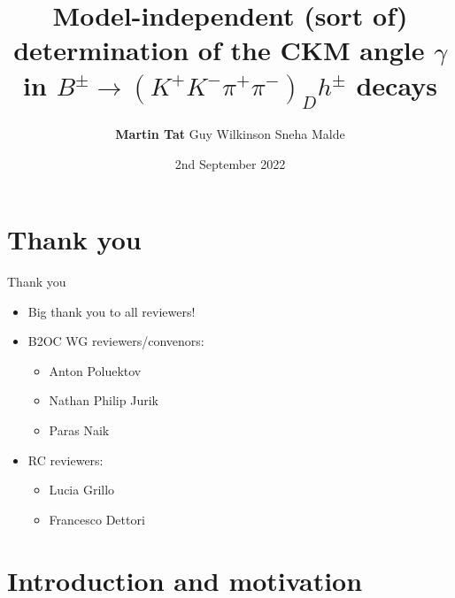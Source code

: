 \documentclass{beamer}
\title[$B^\pm\to(K^+K^-\pi^+\pi^-)_Dh^\pm$]{Model-independent (sort of) determination of the CKM angle \texorpdfstring{$\gamma$}{gamma} in \texorpdfstring{$B^\pm\to(K^+K^-\pi^+\pi^-)_Dh^\pm$}{B to K+K-pi+pi-} decays}
\author{\textbf{Martin Tat} \hspace{0.54em} Guy Wilkinson \hspace{0.54em} Sneha Malde}
\institute{\normalsize University of Oxford \\ \vspace{0.3cm} \normalsize Approval presentation \vspace{-0.2cm}}
\date{2nd September 2022}
\begin{document}
\begin{frame}
  \titlepage
\end{frame}


\section{Thank you}

\begin{frame}{Thank you}
  \begin{itemize}
    \setlength\itemsep{2.0em}
    \item{Big thank you to all reviewers!}
    \item{B2OC WG reviewers/convenors:}
    \begin{itemize}
      \item{Anton Poluektov}
      \item{Nathan Philip Jurik}
      \item{Paras Naik}
    \end{itemize}
    \item{RC reviewers:}
    \begin{itemize}
      \item{Lucia Grillo}
      \item{Francesco Dettori}
    \end{itemize}
  \end{itemize}
\end{frame}

\section{Introduction and motivation}
\end{document}

